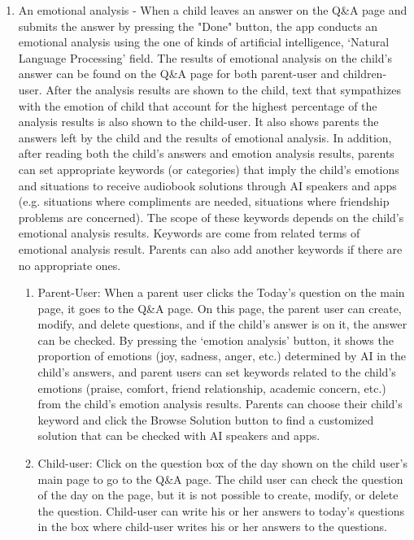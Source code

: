 \documentclass[conference]{IEEEtran}
\begin{document}
\begin{enumerate}
  \item An emotional analysis - When a child leaves an answer on the Q\&A page and submits the answer by pressing the "Done" button, the app conducts an emotional analysis using the one of kinds of artificial intelligence, ‘Natural Language Processing’ field. The results of emotional analysis on the child's answer can be found on the Q\&A page for both parent-user and children-user. After the analysis results are shown to the child, text that sympathizes with the emotion of child that account for the highest percentage of the analysis results is also shown to the child-user. It also shows parents the answers left by the child and the results of emotional analysis. In addition, after reading both the child's answers and emotion analysis results, parents can set appropriate keywords (or categories) that imply the child's emotions and situations to receive audiobook solutions through AI speakers and apps (e.g. situations where compliments are needed, situations where friendship problems are concerned). The scope of these keywords depends on the child's emotional analysis results. Keywords are come from related terms of emotional analysis result. Parents can also add another keywords if there are no appropriate ones.
  \begin{enumerate}
    \item Parent-User: When a parent user clicks the Today's question on the main page, it goes to the Q\&A page. On this page, the parent user can create, modify, and delete questions, and if the child's answer is on it, the answer can be checked. By pressing the ‘emotion analysis’ button, it shows the proportion of emotions (joy, sadness, anger, etc.) determined by AI in the child's answers, and parent users can set keywords related to the child's emotions (praise, comfort, friend relationship, academic concern, etc.) from the child’s emotion analysis results. Parents can choose their child's keyword and click the Browse Solution button to find a customized solution that can be checked with AI speakers and apps.
    \item Child-user: Click on the question box of the day shown on the child user's main page to go to the Q\&A page. The child user can check the question of the day on the page, but it is not possible to create, modify, or delete the question. Child-user can write his or her answers to today's questions in the box where child-user writes his or her answers to the questions.
  \end{enumerate}
\end{enumerate}
\end{document}
